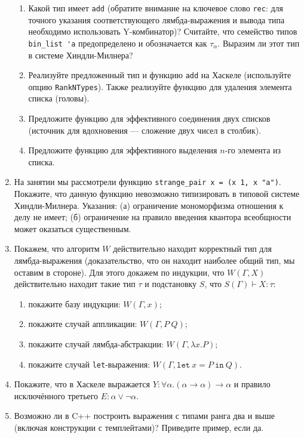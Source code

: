 \documentclass[10pt,a4paper,oneside]{article}
\begin{document}
\begin{enumerate}
\begin{enumerate}
\item Какой тип имеет \verb!add! (обратите внимание на ключевое слово \verb!rec!: для 
точного указания соответствующего лямбда-выражения и вывода типа необходимо использовать Y-комбинатор)?
Считайте, что семейство типов \verb!bin_list 'a! предопределено и обозначается как $\tau_\alpha$.
Выразим ли этот тип в системе Хиндли-Милнера?
\item Реализуйте предложенный тип и функцию \verb!add! на Хаскеле (используйте опцию \verb!RankNTypes!).
Также реализуйте функцию для удаления элемента списка (головы).
\item Предложите функцию для эффективного соединения двух списков (источник для 
вдохновения --- сложение двух чисел в столбик).
\item Предложите функцию для эффективного выделения $n$-го элемента из списка.
\end{enumerate}
\item На занятии мы рассмотрели функцию \verb!strange_pair x = (x 1, x "a")!.
Покажите, что данную функцию невозможно типизировать в типовой системе Хиндли-Милнера.
Указания: (а) ограничение мономорфизма отношения к делу не имеет;
(б) ограничение на правило введения квантора всеобщности может оказаться существенным.
\item Покажем, что алгоритм $W$ действительно находит корректный тип для лямбда-выражения
(доказательство, что он находит наиболее общий тип, мы оставим в стороне).
Для этого докажем по индукции, что $W(\Gamma,X)$ действительно находит такие тип $\tau$ и подстановку $S$,
что $S(\Gamma) \vdash X:\tau$:
\begin{enumerate}
\item покажите базу индукции: $W(\Gamma,x)$;
\item покажите случай аппликации: $W(\Gamma,P\ Q)$;
\item покажите случай лямбда-абстракции: $W(\Gamma,\lambda x.P)$;
\item покажите случай \verb!let!-выражения: $W(\Gamma,\texttt{let}\ x=P\ \texttt{in}\ Q)$.
\end{enumerate}
\item Покажите, что в Хаскеле выражается $Y: \forall \alpha.(\alpha\rightarrow\alpha)\rightarrow\alpha$ и
правило исключённого третьего $E: \alpha\vee\neg\alpha$.
\item Возможно ли в C++ построить выражения с типами ранга два и выше (включая конструкции с темплейтами)? 
Приведите пример, если да.
\end{enumerate}
\end{document}
